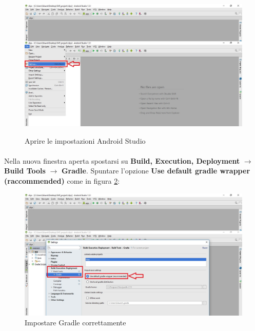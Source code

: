\documentclass[../ManualeSviluppatore.tex]{subfiles}
\begin{document}
		\begin{figure} [h]
			\centering
			\includegraphics[width=\textwidth]{img/settings}
			\label{fig:Settings}
			\caption{Aprire le impostazioni Android Studio}
		\end{figure}
		
		\paragraph*{}
			Nella nuova finestra aperta spostarsi su \textbf{Build, Execution, Deployment} $\rightarrow$ \textbf{Build Tools} $\rightarrow$ \textbf{Gradle}. Spuntare l'opzione \textbf{Use default gradle wrapper (raccommended)} come in figura \ref{fig:SetGradle}:
			
			\begin{figure} [h]
				\centering
				\includegraphics[width=\textwidth]{img/SetGradle}
				\caption{Impostare Gradle correttamente}
				\label{fig:SetGradle}
			\end{figure}
		
		
		\newpage		
\end{document}
